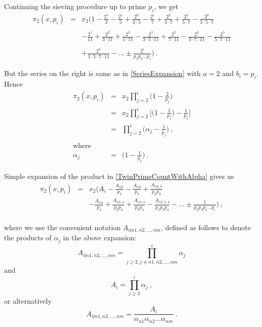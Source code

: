 \documentclass{article}
\numberwithin{equation}{section}
\begin{document}
Continuing the sieving procedure up to prime $p_i$, we get
\begin{eqnarray}
\pi_2(x,p_i) &=& x_2 \Big(1 - \frac{2^1}{3} - \frac{2^1}{5} + \frac{2^2}{3 \cdot 5} - \frac{2^1}{7} + \frac{2^2}{3 \cdot 7} + \frac{2^2}{5 \cdot 7} - \frac{2^3}{3 \cdot 5 \cdot 7} 
\nonumber\\
\nonumber\\
{} & & - \frac{2^1}{11} + \frac{2^2}{3 \cdot 11} + \frac{2^2}{5 \cdot 11} - \frac{2^3}{3 \cdot 5 \cdot 11} + \frac{2^2}{7 \cdot 11} - \frac{2^3}{3 \cdot 7 \cdot 11} - \frac{2^3}{5 \cdot 7 \cdot 11}
\nonumber\\
\nonumber\\
{} & & + \frac{2^4}{3 \cdot 5 \cdot 7 \cdot 11} - \ldots \pm \frac{2^i}{p_1 p_2 \ldots p_i}\Big) ~ \nonumber.
\end{eqnarray}

But the series on the right is same as in \eqref{SeriesExpansion} with $a=2$ and $b_i=p_i$. Hence
\begin{eqnarray}
\pi_2(x,p_i) & = & x_2 \prod\limits_{j = 2}^i {\Big(1-\frac{2}{p_j}\Big)}
\label{TwinPrimeCountWithoutAlpha} \\
& = & x_2 \prod\limits_{j = 2}^i {\Big[\Big(1 - \frac{1}{p_j} \Big) -\frac{1}{p_j} \Big]} 
\nonumber\\
& = & \prod\limits_{j = 2}^i {\Big(\alpha_j -\frac{1}{p_j} \Big)} \label{TwinPrimeCountWithAlpha} ~ ,
\\
\nonumber\\
\textrm{where}
\nonumber\\
\alpha_j &=& \Big(1 - \frac{1}{p_j} \Big) \label{AlphaDefinition} ~ .
\end{eqnarray}

Simple expansion of the product in \eqref{TwinPrimeCountWithAlpha} gives us
\begin{eqnarray} \nonumber
\pi_2(x,p_i) &=& x_2 \Big( A_i - \frac{A_{i\wr2}}{p_2} - \frac{A_{i\wr3}}{p_3} + \frac{A_{i\wr2,3}}{p_2 p_3} 
\nonumber\\
{} & & - \frac{A_{i\wr4}}{p_4} + \frac{A_{i\wr2,4}}{p_2 p_4} + \frac{A_{i\wr3,4}}{p_3 p_4}
- \frac{A_{i\wr2,3,4}}{p_2 p_3 p_4} - \ldots \pm \frac{1}{p_2 p_3 p_4 \ldots p_i}
\Big) \label{ExpandedTwinPrimeCountAsProduct} ~ ,
\end{eqnarray}
\\
where we use the convenient notation $A_{i\wr n1,n2,\ldots,nm}$, defined as follows to denote the products of $\alpha_j$ in the above expansion:
\begin{equation} 
A_{i\wr n1,n2,\ldots,nm} = \prod\limits_{j \ge 2, j \ne n1,n2,\ldots,nm}^i {\alpha _j }
\end{equation}
and
\begin{equation} \label{DefinitionOfAk}
A_{i} = \prod\limits_{\scriptstyle j \ge 2}^i {\alpha _j } ~ ,
\end{equation}
or alternatively
\begin{equation} \nonumber
A_{i\wr n1,n2,\ldots,nm} = \frac{A_i}{\alpha_{n1} \alpha_{n2} \ldots \alpha_{nm}} ~ .
\end{equation}
\end{document}
